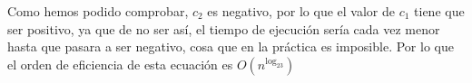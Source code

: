 \documentclass[10pt,a4paper,spanish]{report}
\begin{document}
Como hemos podido comprobar, $c_2$ es negativo, por lo que el valor de $c_1$ tiene que ser positivo, ya que de no ser así, el tiempo de ejecución sería cada vez menor hasta que pasara a ser negativo, cosa que en la práctica es imposible. Por lo que el orden de eficiencia de esta ecuación es $O(n^{\log_23})$
\end{document}
